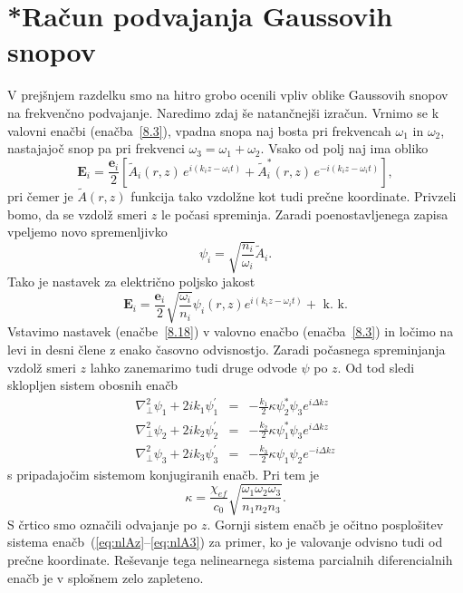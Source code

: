 \section{{*}Račun podvajanja Gaussovih snopov}
V prejšnjem razdelku smo na hitro grobo ocenili vpliv oblike Gaussovih snopov
na frekvenčno podvajanje. Naredimo zdaj še natančnejši izračun. Vrnimo se k valovni
enačbi (enačba~\ref{8.3}), vpadna snopa naj bosta pri frekvencah
$\omega_{1}$ in $\omega_{2}$, nastajajoč snop pa pri frekvenci
$\omega_{3}=\omega_{1}+\omega_{2}$.
Vsako od polj naj ima obliko 
\begin{equation}
\mathbf{E}_{i}  = \frac{\mathbf{e}_{i}}{2}\left[\tilde{A}_{i}(r,z)\, 
e^{i(k_{i}z-\omega_{i}t)}+\tilde{A}_{i}^{*}(r,z)\, e^{-i(k_{i}z-\omega_{i}t)}\right],
\end{equation}
pri čemer je $\tilde{A}(r,z)$ funkcija tako vzdolžne kot tudi prečne koordinate. Privzeli
bomo, da se vzdolž smeri  $z$ le počasi spreminja.
Zaradi poenostavljenega zapisa vpeljemo novo spremenljivko 
\begin{equation}
\psi_i = \sqrt{\frac{n_i}{\omega_i}}\tilde{A}_i.
\end{equation}
Tako je nastavek za električno poljsko jakost
\begin{equation}
\mathbf{E}_{i}=\frac{\mathbf{e}_{i}}{2}\sqrt{\frac{\omega_{i}}{n_{i}}}\psi_{i}(r,z)
e^{i(k_{i}z-\omega_{i}t)}+\mbox{ k. k.}
\label{8.18}
\end{equation}
Vstavimo nastavek (enačbe~\ref{8.18}) v valovno
enačbo (enačba~\ref{8.3}) in ločimo na levi in desni člene z enako časovno odvisnostjo.
Zaradi počasnega spreminjanja vzdolž smeri $z$ lahko zanemarimo tudi druge odvode 
$\psi$ po $z$. Od tod sledi sklopljen sistem obosnih enačb 
\begin{eqnarray}
\nabla_{\perp}^{2}\psi_{1}+2ik_{1}\psi_{1}^{\prime} & = & -
\frac{k_{1}}{2}\kappa\psi_{2}^{\ast}\psi_{3}e^{i\Delta kz}\\
\nabla_{\perp}^{2}\psi_{2}+2ik_{2}\psi_{2}^{\prime} & = & -
\frac{k_{2}}{2}\kappa\psi_{1}^{\ast}\psi_{3}e^{i\Delta kz}\\
\nabla_{\perp}^{2}\psi_{3}+2ik_{3}\psi_{3}^{\prime} & =
& - \frac{k_{3}}{2}\kappa\psi_{1}\psi_{2}e^{-i\Delta kz}
\label{SHGGauss_3}
\end{eqnarray}
s pripadajočim sistemom konjugiranih enačb. Pri tem je 
\begin{equation}
\kappa=\frac{\chi_{ef}}{c_0} \sqrt{\frac{\omega_{1}\omega_{2}\omega_{3}}{n_{1}n_{2}n_{3}}}.
\label{8.20}
\end{equation}
S črtico smo označili odvajanje po $z$. Gornji sistem enačb je očitno
posplošitev sistema enačb~(\ref{eq:nlAz}--\ref{eq:nlA3}) za primer, ko je valovanje odvisno
tudi od prečne koordinate. Reševanje tega nelinearnega sistema parcialnih
diferencialnih enačb je v splošnem zelo zapleteno.

